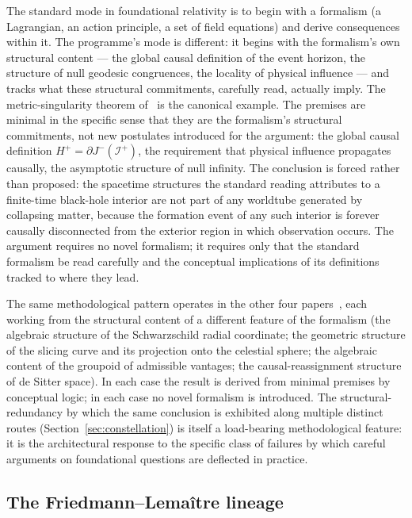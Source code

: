 \documentclass[11pt,a4paper]{article}
\theoremstyle{definition}
\begin{document}
The standard mode in foundational relativity is to begin with a formalism (a Lagrangian, an action principle, a set of field equations) and derive consequences within it. The programme's mode is different: it begins with the formalism's own structural content --- the global causal definition of the event horizon, the structure of null geodesic congruences, the locality of physical influence --- and tracks what these structural commitments, carefully read, actually imply. The metric-singularity theorem of~\cite{JanzenBHcausality} is the canonical example. The premises are minimal in the specific sense that they are the formalism's structural commitments, not new postulates introduced for the argument: the global causal definition $H^{+}=\partial J^{-}(\mathscr{I}^{+})$, the requirement that physical influence propagates causally, the asymptotic structure of null infinity. The conclusion is forced rather than proposed: the spacetime structures the standard reading attributes to a finite-time black-hole interior are not part of any worldtube generated by collapsing matter, because the formation event of any such interior is forever causally disconnected from the exterior region in which observation occurs. The argument requires no novel formalism; it requires only that the standard formalism be read carefully and the conceptual implications of its definitions tracked to where they lead.

The same methodological pattern operates in the other four papers~\cite{JanzenCircle, JanzenSlicing, JanzenGroupoid, JanzenCRcosmology}, each working from the structural content of a different feature of the formalism (the algebraic structure of the Schwarzschild radial coordinate; the geometric structure of the slicing curve and its projection onto the celestial sphere; the algebraic content of the groupoid of admissible vantages; the causal-reassignment structure of de Sitter space). In each case the result is derived from minimal premises by conceptual logic; in each case no novel formalism is introduced. The structural-redundancy by which the same conclusion is exhibited along multiple distinct routes (Section~\ref{sec:constellation}) is itself a load-bearing methodological feature: it is the architectural response to the specific class of failures by which careful arguments on foundational questions are deflected in practice.

\subsection{The Friedmann--Lema\^itre lineage}\label{sec:fl-lineage}
\end{document}
